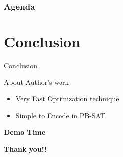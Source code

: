 \documentclass{beamer}
\begin{document}
\begin{frame}
  \frametitle{Agenda}
  \section{Conclusion}
  \tableofcontents[currentsection]
\end{frame}

\begin{frame}[fragile]{Conclusion}
  \begin{block}{About Author's work}
    \begin{itemize}
      \item Very Fast Optimization technique
      \item Simple to Encode in PB-SAT 
  \end{itemize}
  \end{block}
\end{frame}

\begin{frame}
  \begin{center}
    \textbf{\huge{Demo Time}}
    \end{center}
\end{frame}


\begin{frame}
  \begin{center}
    \textbf{\huge{Thank you!!}}
    \end{center}
\end{frame}
\end{document}
